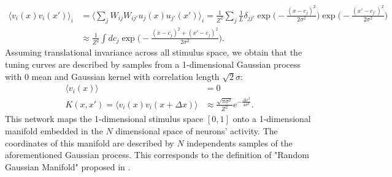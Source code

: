 \documentclass[a4paper]{article}
\begin{document}
\begin{equation}
\begin{split}
\langle v_i(x)v_i(x') \rangle_i &= \Big\langle \sum_j W_{ij}W_{ij'} u_j(x)u_{j'}(x') \Big\rangle_i = \frac{1}{Z^2} \sum_j \frac{1}{L}\delta_{jj'}\exp \Big(-\frac{(x-c_j)^2}{2\sigma^2} \Big) \exp\Big(-\frac{(x'-c_{j'})^2}{2\sigma^2}\Big)\\
&\approx \frac{1}{Z^2 }  \int dc_j \exp\Big(-\frac{(x-c_j)^2 + (x'-c_j)^2}{2\sigma^2}\Big).
\end{split}
\end{equation}
Assuming translational invariance across all stimulus space, we obtain that the tuning curves are described by samples from a  1-dimensional Gaussian process with 0 mean and Gaussian kernel with correlation length $\sqrt{2}\sigma$:
\begin{equation}
\begin{split}
\langle v _i (x )\rangle  &=0 \\
K(x,x') = \langle v_i(x)v_i(x + \Delta x )\rangle  &\approx  \frac{\sqrt{\pi\sigma^2}}{Z^2} e^{-\frac{\Delta x^2}{4 \sigma^2}}.
\end{split}
\end{equation}This network maps the 1-dimensional stimulus space $[0,1]$ onto a 1-dimensional manifold embedded in the $N$ dimensional space of neurons' activity. The coordinates of this manifold are described by $N$ independents samples of the aforementioned Gaussian process. This corresponds to the definition of "Random Gaussian Manifold" proposed in   \cite{Lahiri2016RandomManifolds,Gao2017AMeasurement}.
\newline
\newline
\end{document}
